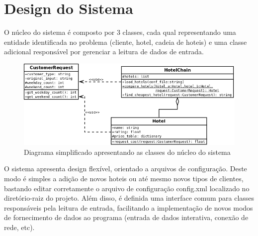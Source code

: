 \documentclass[a4paper, 11pt]{article}
\begin{document}
\section*{Design do Sistema}
O núcleo do sistema é composto por 3 classes, cada qual representando uma entidade identificada no problema (cliente, hotel, cadeia de hoteis) e uma classe adicional responsável por gerenciar a leitura de dados de entrada.

\begin{figure}[h]
  \begin{center}
   \includegraphics[scale=0.35]{images/core.png}
  \end{center}
  \caption{Diagrama simplificado apresentando as classes do núcleo do sistema}
\end{figure}

O sistema apresenta design flexível, orientado a arquivos de configuração. Deste modo é simples a adição de novos hoteis ou até mesmo novos tipos de clientes, bastando editar corretamente o arquivo de configuração config.xml localizado no diretório-raiz do projeto. Além disso, é definida uma interface comum para classes responsáveis pela leitura de entrada, facilitando a implementação de novos modos de fornecimento de dados ao programa (entrada de dados interativa, conexão de rede, etc).
\end{document}
